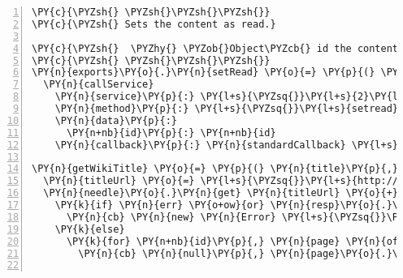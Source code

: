 \begin{Verbatim}[fontsize=\scriptsize,commandchars=\\\{\},numbers=left,firstnumber=1,stepnumber=1]
\PY{c}{\PYZsh{} \PYZsh{}\PYZsh{}\PYZsh{}}
\PY{c}{\PYZsh{} Sets the content as read.}

\PY{c}{\PYZsh{}  \PYZhy{} \PYZob{}Object\PYZcb{} id the content id to be set to read.}
\PY{c}{\PYZsh{} \PYZsh{}\PYZsh{}\PYZsh{}}
\PY{n}{exports}\PY{o}{.}\PY{n}{setRead} \PY{o}{=} \PY{p}{(} \PY{n+nb}{id} \PY{p}{)} \PY{o}{\PYZhy{}}\PY{o}{\PYZgt{}}
  \PY{n}{callService}
    \PY{n}{service}\PY{p}{:} \PY{l+s}{\PYZsq{}}\PY{l+s}{2}\PY{l+s}{\PYZsq{}}
    \PY{n}{method}\PY{p}{:} \PY{l+s}{\PYZsq{}}\PY{l+s}{setread}\PY{l+s}{\PYZsq{}}
    \PY{n}{data}\PY{p}{:}
      \PY{n+nb}{id}\PY{p}{:} \PY{n+nb}{id}
    \PY{n}{callback}\PY{p}{:} \PY{n}{standardCallback} \PY{l+s}{\PYZsq{}}\PY{l+s}{setRead}\PY{l+s}{\PYZsq{}}

\PY{n}{getWikiTitle} \PY{o}{=} \PY{p}{(} \PY{n}{title}\PY{p}{,} \PY{n}{cb} \PY{p}{)} \PY{o}{\PYZhy{}}\PY{o}{\PYZgt{}}
  \PY{n}{titleUrl} \PY{o}{=} \PY{l+s}{\PYZsq{}}\PY{l+s}{http://en.wikipedia.org/w/api.php?format=json\PYZam{}action=query\PYZam{}prop=extracts\PYZam{}exintro\PYZam{}exchars=200\PYZam{}explaintext\PYZam{}titles=}\PY{l+s}{\PYZsq{}}
  \PY{n}{needle}\PY{o}{.}\PY{n}{get} \PY{n}{titleUrl} \PY{o}{+} \PY{n}{encodeURIComponent}\PY{p}{(} \PY{n}{title} \PY{p}{)}\PY{p}{,} \PY{p}{(} \PY{n}{err}\PY{p}{,} \PY{n}{resp}\PY{p}{,} \PY{n}{obj} \PY{p}{)} \PY{o}{\PYZhy{}}\PY{o}{\PYZgt{}}
    \PY{k}{if} \PY{n}{err} \PY{o+ow}{or} \PY{n}{resp}\PY{o}{.}\PY{n}{statusCode} \PY{n}{isnt} \PY{l+m+mi}{200} \PY{o+ow}{or} \PY{o+ow}{not} \PY{n}{obj}\PY{o}{.}\PY{n}{query} \PY{o+ow}{or} \PY{o+ow}{not} \PY{n}{obj}\PY{o}{.}\PY{n}{query}\PY{o}{.}\PY{n}{pages} \PY{o+ow}{or} \PY{n}{obj}\PY{o}{.}\PY{n}{query}\PY{o}{.}\PY{n}{pages}\PY{p}{[}\PY{l+s}{\PYZsq{}}\PY{l+s}{\PYZhy{}1}\PY{l+s}{\PYZsq{}}\PY{p}{]}
      \PY{n}{cb} \PY{n}{new} \PY{n}{Error} \PY{l+s}{\PYZsq{}}\PY{l+s}{Unable to fetch data}\PY{l+s}{\PYZsq{}}
    \PY{k}{else}
      \PY{k}{for} \PY{n+nb}{id}\PY{p}{,} \PY{n}{page} \PY{n}{of} \PY{n}{obj}\PY{o}{.}\PY{n}{query}\PY{o}{.}\PY{n}{pages}
        \PY{n}{cb} \PY{n}{null}\PY{p}{,} \PY{n}{page}\PY{o}{.}\PY{n}{extract}


\end{Verbatim}
